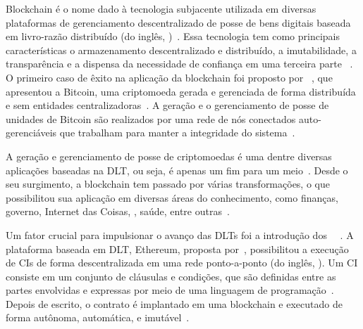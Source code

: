 \newcommand{\comando}[1]{\textbf{$\backslash$#1}}




Blockchain é o nome dado à tecnologia subjacente utilizada em diversas plataformas de gerenciamento descentralizado de posse de bens digitais baseada em livro-razão distribuído (do inglês,  )~\cite{kannengiesser2020trade-offs-acmcs}. Essa tecnologia tem como principais características o armazenamento descentralizado e distribuído, a imutabilidade, a transparência e a dispensa da necessidade de confiança em uma terceira parte ~\cite{fan2020performance, overview-dinh-2018}. O primeiro caso de êxito na aplicação da blockchain foi proposto por ~, que apresentou a Bitcoin, uma criptomoeda gerada e gerenciada de forma distribuída e sem entidades centralizadoras~\cite{zhang2019blockchain-security-acmcs}. A geração e o gerenciamento de posse de unidades de Bitcoin são realizados por uma rede de nós conectados auto-gerenciáveis que trabalham para manter a integridade do sistema~\cite{overview-dinh-2018}. 

A geração e gerenciamento de posse de criptomoedas é uma dentre diversas aplicações baseadas na DLT, ou seja, é apenas um fim para um meio~\cite{overview-blockchainbasic2018drescher}. Desde o seu surgimento, a blockchain tem passado por várias transformações, o que possibilitou sua aplicação em diversas áreas do conhecimento, como finanças, governo, Internet das Coisas, , saúde, entre outras~\cite{swan2015blockchain-book, maesa2020blockchain3.0, zhu2019iot-applications, salah2019review-blockchain-ai, erikson2020survey-health}. 

Um fator crucial para impulsionar o avanço das DLTs foi a introdução dos ~~\cite{maesa2020blockchain3.0}. A plataforma baseada em DLT, Ethereum, proposta por~, possibilitou a execução de CIs de forma descentralizada em uma rede ponto-a-ponto (do inglês, ). Um CI consiste em um conjunto de cláusulas e condições, que são definidas entre as partes envolvidas e expressas por meio de uma linguagem de programação~\cite{overview-smartcontracts2020zheng}. Depois de escrito, o contrato é implantado em uma blockchain e executado de forma autônoma, automática, e imutável~\cite{overview-smartcontracts2020zheng, kannengiesser2020trade-offs-acmcs}. 

